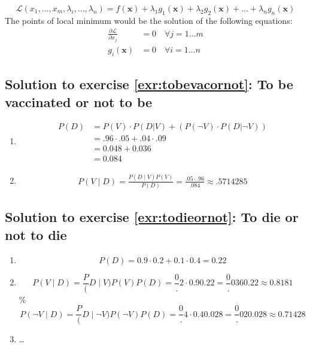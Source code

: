 \documentclass[
  12pt,
  oneside]{book}
\providecommand{\tightlist}{%
  \setlength{\itemsep}{0pt}\setlength{\parskip}{0pt}}
\theoremstyle{definition}
\theoremstyle{definition}
\theoremstyle{definition}
\theoremstyle{definition}
\theoremstyle{remark}
\begin{document}
\[
\mathcal{L}(x_1, \dots, x_m, \lambda_i, \dots, \lambda_n)=f(\mathbf{x})+\lambda_1 g_1(\mathbf{x})+\lambda_2 g_2(\mathbf{x})+\ldots+\lambda_n g_n(\mathbf{x})
\]
The points of local minimum would be the solution of the following equations:
\begin{align*}
    \frac{\partial \mathcal{L}}{\partial x_{j}} &=0 \quad \forall j=1 \dots m \\
    g_i(\mathbf{x}) &=0 \quad \forall i=1\dots n
\end{align*}

\subsection*{Solution to exercise \ref{exr:tobevacornot}: To be vaccinated or not to be}\label{sol:tobevacornot}

\begin{enumerate}
\def\labelenumi{\alph{enumi})}
\tightlist
\item
  \begin{align*}
            P(D)&=P(V)\cdot P(D|V)+(P(\neg V)\cdot P(D|\neg V))\\
            &= .96\cdot .05 + .04 \cdot .09\\
            &= 0.048 + 0.036 \\&= 0.084
  \end{align*}
\item
  \begin{align*}
  P(V \mid D)={\frac {P(D\mid V)P(V)}{P(D)}}= \frac{.05\cdot .96}{.084}\approx .5714285
  \end{align*}
\end{enumerate}

\subsection*{Solution to exercise \ref{exr:todieornot}: To die or not to die}\label{sol:todieornot}

\begin{enumerate}
\def\labelenumi{\alph{enumi})}
\tightlist
\item
  \[P(D) = 0.9\cdot0.2+0.1\cdot0.4=0.22\]
\item
  \[P(V\mid D)=\frac P(D\mid V)P(V)P(D)=\frac0.2\cdot 0.90.22=\frac0.0360.22\approx0.8181\]
  \% \[P(\neg V\mid D)=\frac P(D\mid \neg V)P(\neg V)P(D)=\frac0.4\cdot 0.40.028=\frac0.020.028\approx0.71428\]
\item
  \ldots{}
\end{enumerate}
\end{document}
